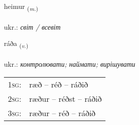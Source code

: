 \documentclass[frontgrid, backgrid]{flacards}\usepackage[]{graphicx}\usepackage[]{xcolor}
\begin{document}
\renewcommand{\flhead}{\vskip5pt \fboxsep=0pt {\small\bfseries\footnotesize Nafnorð | іменник}}
\renewcommand{\fcfoot}{\vskip5pt \fboxsep=0pt \hspace{2pt}{\small\bfseries\footnotesize 1K}}

\renewcommand{\blhead}{\vskip5pt {\small\bfseries\footnotesize Nafnorð | іменник }}
\renewcommand{\bcfoot}{\vskip5pt \hspace{2pt}{\small\bfseries\footnotesize 1K}}


{heimur \small{\textsubscript{(\textit{m.})}} \\[1ex] %
\textphonetic{[heiːmʏr]} \\
ukr.: \emph{світ / всевіт} \\  [2ex]
\renewcommand*{\arraystretch}{0.8}
}

\renewcommand{\flhead}{\vskip5pt \fboxsep=0pt {\small\bfseries\footnotesize Sagnorð | дієслово}}
\renewcommand{\fcfoot}{\vskip5pt \fboxsep=0pt \hspace{2pt}{\small\bfseries\footnotesize 1K}}

\renewcommand{\blhead}{\vskip5pt {\small\bfseries\footnotesize Sagnorð | дієслово }}
\renewcommand{\bcfoot}{\vskip5pt \hspace{2pt}{\small\bfseries\footnotesize 1K}}


{ráða \small{\textsubscript{(\textit{v.})}} \\[1ex] %
\textphonetic{[rauːða]} \\
ukr.: \emph{контролювати; наймати; вирішувати} \\  [2ex]
\renewcommand*{\arraystretch}{0.8}
\begin{tabular}{p{1cm}l}
\textsc{1sg}: & ræð -- réð -- ráðið \\ 
\textsc{2sg}: & ræður -- réðst -- ráðið \\ 
\textsc{3sg}: & ræður -- réð -- ráðið \\ 
\end{tabular}
}
\end{document}
